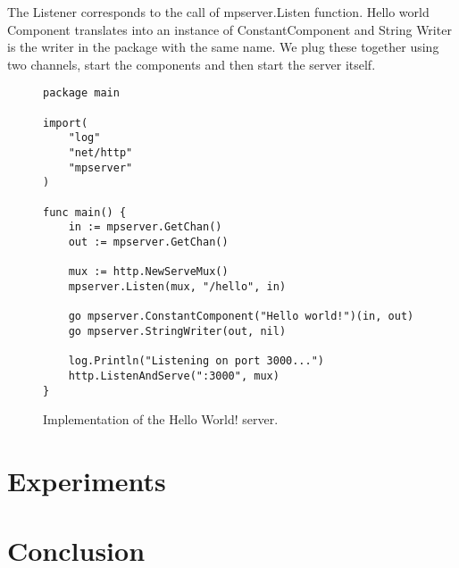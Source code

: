 \documentclass[12pt,a4paper]{article}
\begin{document}
The Listener corresponds to the call of mpserver.Listen function.
Hello world Component translates into an instance of ConstantComponent
and String Writer is the writer in the package with the same name.
We plug these together using two channels, start the components 
and then start the server itself.

\begin{figure}[h]
\centering
\begin{lstlisting}
package main

import(
    "log"
    "net/http"
    "mpserver"
)

func main() {
    in := mpserver.GetChan()
    out := mpserver.GetChan()

    mux := http.NewServeMux()
    mpserver.Listen(mux, "/hello", in)

    go mpserver.ConstantComponent("Hello world!")(in, out)
    go mpserver.StringWriter(out, nil)
    
    log.Println("Listening on port 3000...")
    http.ListenAndServe(":3000", mux)
}
\end{lstlisting}
\caption[scale=1.0]{Implementation of the Hello World! server.}
\label{fig:HelloWorldImpl}
\end{figure}

\newpage
\section{Experiments}
\label{sec:test}
\newpage
\section{Conclusion}
\label{sec:conclusion}

\newpage
\printbibliography[
    heading=bibintoc,
    title={References}
]
\end{document}

